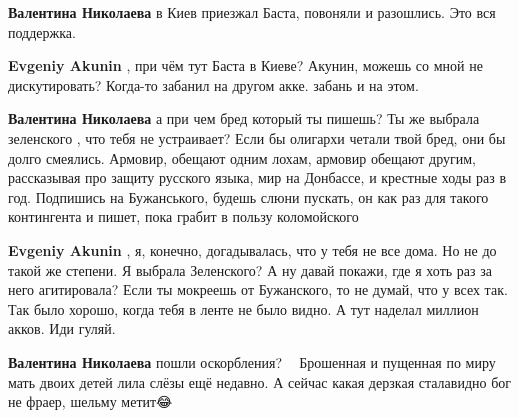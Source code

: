 \begin{itemize}
\begin{itemize}
\textbf{Валентина Николаева} в Киев приезжал Баста, повоняли и разошлись. Это вся поддержка.

 
\textbf{Evgeniy Akunin} , при чём тут Баста в Киеве? Акунин, можешь со мной не
дискутировать? Когда-то забанил на другом акке. забань и на этом.

 
\textbf{Валентина Николаева} а при чем бред который ты пишешь? Ты же выбрала
зеленского , что тебя не устраивает? Если бы олигархи четали твой бред, они бы
долго смеялись. Армовир, обещают одним лохам, армовир обещают другим,
рассказывая про защиту русского языка, мир на Донбассе, и крестные ходы раз в
год. Подпишись на Бужанського, будешь слюни пускать, он как раз для такого
контингента и пишет, пока грабит в пользу коломойского\Laughey[1.0][white]

 
\textbf{Evgeniy Akunin} , я, конечно, догадывалась, что у тебя не все дома. Но
не до такой же степени. Я выбрала Зеленского? А ну давай покажи, где я хоть раз
за него агитировала? Если ты мокреешь от Бужанского, то не думай, что у всех
так. Так было хорошо, когда тебя в ленте не было видно. А тут наделал миллион
акков. Иди гуляй.

 
\textbf{Валентина Николаева} пошли оскорбления? 🎉😂 Брошенная и пущенная по
миру мать двоих детей лила слёзы ещё недавно. А сейчас какая дерзкая стала\Laughey[1.0][white]
видно бог не фраер, шельму метит😂🖕


\end{itemize}
\end{itemize}
